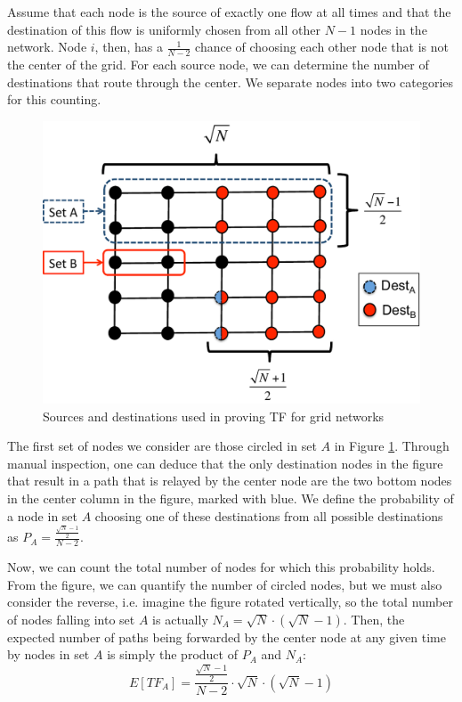 Assume that each node is the source of exactly one flow at all times and that the destination of this flow is uniformly chosen from all other $N-1$ nodes in the network.  Node $i$, then, has a $\frac{1}{N-2}$ chance of choosing each other node that is not the center of the grid.  For each source node, we can determine the number of destinations that route through the center.  We separate nodes into two categories for this counting.

\begin{figure}
\begin{centering}
    \includegraphics[scale=0.33]{TF_proof_fig_color.pdf}
    \vspace{-4mm}
    \caption{Sources and destinations used in proving TF for grid networks}
    \label{fig:TF_proof_fig}
    \vspace{-6mm}
\end{centering}
\end{figure}

The first set of nodes we consider are those circled in set $A$ in Figure \ref{fig:TF_proof_fig}.  Through manual inspection, one can deduce that the only destination nodes in the figure that result in a path that is relayed by the center node are the two bottom nodes in the center column in the figure, marked with blue.  We define the probability of a node in set $A$ choosing one of these destinations from all possible destinations as $P_{A} = \frac{\frac{\sqrt{N}-1}{2}}{N-2}$.

Now, we can count the total number of nodes for which this probability holds.  From the figure, we can quantify the number of circled nodes, but we must also consider the reverse, i.e. imagine the figure rotated vertically, so the total number of nodes falling into set $A$ is actually $N_A = \sqrt{N} \cdot (\sqrt{N}-1)$.
Then, the expected number of paths being forwarded by the center node at any given time by nodes in set $A$ is simply the product of $P_A$ and $N_A$:
\begin{equation}
	E[TF_{A}] = \frac{\frac{\sqrt{N}-1}{2}}{N-2}  \cdot  \sqrt{N} \cdot (\sqrt{N}-1)
\end{equation}

